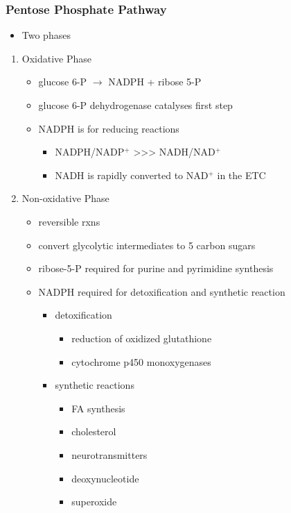 \documentclass{scrartcl}
\begin{document}
\subsubsection{Pentose Phosphate Pathway}
\label{sec:org1165c02}
\begin{itemize}
\item Two phases
\end{itemize}
\begin{enumerate}
\item Oxidative Phase
\label{sec:orgfaa8d2c}
\begin{itemize}
\item glucose 6-P \(\to\) NADPH + ribose 5-P
\item glucose 6-P dehydrogenase catalyses first step
\item NADPH is for reducing reactions
\begin{itemize}
\item NADPH/NADP\(^{\text{+}}\) \textgreater{}\textgreater{}\textgreater{} NADH/NAD\(^{\text{+}}\)
\item NADH is rapidly converted to NAD\(^{\text{+}}\) in the ETC
\end{itemize}
\end{itemize}
\item Non-oxidative Phase
\label{sec:org66d7a5c}
\begin{itemize}
\item reversible rxns
\item convert glycolytic intermediates to 5 carbon sugars

\item ribose-5-P required for purine and pyrimidine synthesis
\item NADPH required for detoxification and synthetic reaction
\begin{itemize}
\item detoxification
\begin{itemize}
\item reduction of oxidized glutathione
\item cytochrome p450 monoxygenases
\end{itemize}
\item synthetic reactions
\begin{itemize}
\item FA synthesis
\item cholesterol
\item neurotransmitters
\item deoxynucleotide
\item superoxide
\end{itemize}
\end{itemize}
\end{itemize}
\end{enumerate}
\end{document}

